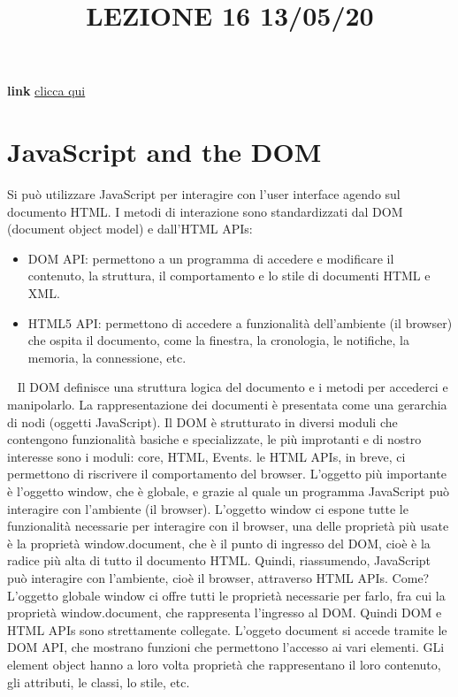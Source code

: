 \title{LEZIONE 16 13/05/20}
\textbf{link} \href{https://web.microsoftstream.com/video/5539d88f-c229-4790-acbc-d3ce4660da70?list=user&userId=cfe0965d-9a7c-40e2-be6e-f078296a1914}{clicca qui}
\section{JavaScript and the DOM}
Si può utilizzare JavaScript per interagire con l'user interface agendo sul documento HTML.\newline
\newline
I metodi di interazione sono standardizzati dal DOM (document object model) e dall'HTML APIs:
\begin{itemize}
    \item DOM API: permettono a un programma di accedere e modificare il contenuto, la struttura, il comportamento e lo stile di documenti HTML e XML.
    \item HTML5 API: permettono di accedere a funzionalità dell'ambiente (il browser) che ospita il documento, come la finestra, la cronologia, le notifiche, la memoria, la connessione, etc.
\end{itemize}
\ \newline
Il DOM definisce una struttura logica del documento e i metodi per accederci e manipolarlo.\newline
La rappresentazione dei documenti è presentata come una gerarchia di nodi (oggetti JavaScript).\newline
Il DOM è strutturato in diversi moduli che contengono funzionalità basiche e specializzate, le più improtanti e di nostro interesse sono i moduli: core, HTML, Events.\newline
\newline
le HTML APIs, in breve, ci permettono di riscrivere il comportamento del browser.\newline
L'oggetto più importante è l'oggetto window, che è globale, e grazie al quale un programma JavaScript può interagire con l'ambiente (il browser). L'oggetto window ci espone tutte le funzionalità necessarie per interagire con il browser, una delle proprietà più usate è la proprietà window.document, che è il punto di ingresso del DOM, cioè è la radice più alta di tutto il documento HTML.\newline
\newline
Quindi, riassumendo, JavaScript può interagire con l'ambiente, cioè il browser, attraverso HTML APIs. Come? L'oggetto globale window ci offre tutti le proprietà necessarie per farlo, fra cui la proprietà window.document, che rappresenta l'ingresso al DOM. Quindi DOM e HTML APIs sono strettamente collegate. L'oggeto document si accede tramite le DOM API, che mostrano funzioni che permettono l'accesso ai vari elementi. GLi element object hanno a loro volta proprietà che rappresentano il loro contenuto, gli attributi, le classi, lo stile, etc.\newline
